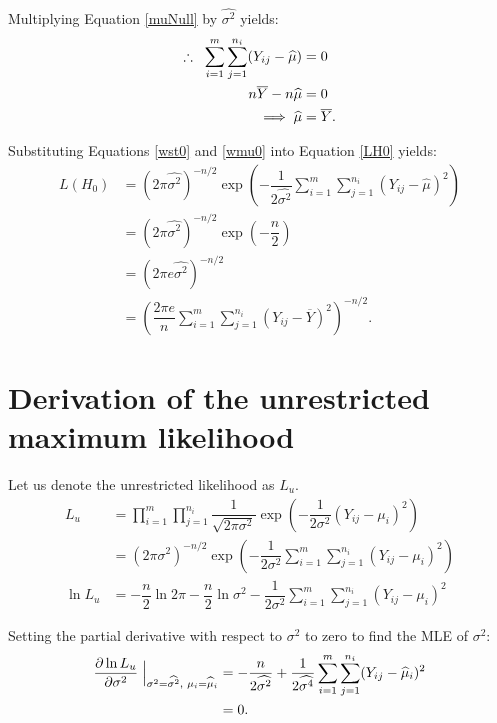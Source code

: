 \documentclass[12pt,a4paper,openright]{article}
\newcommand{\eqn}[1]{Equation \ref{#1}}
\newcommand{\ovY}{\overline{Y}}
\newcommand{\wmu}{\widehat{\mu}}
\newcommand{\wst}{\widehat{\sigma^2}}
\begin{document}
	Multiplying \eqn{muNull} by $\wst$ yields:
	\begin{align}
		\therefore \hspace{0.2cm} \sum_{i=1}^m \sum_{j=1}^{n_i} (Y_{ij}-\wmu) &= 0 \nonumber\\
		n\ovY - n\wmu &= 0 \nonumber \\
		\implies \wmu &= \ovY. \label{wmu0}
	\end{align}

	Substituting Equations \ref{wst0} and \ref{wmu0} into \eqn{LH0} yields:
	\begin{align}
		L(H_0) &= (2\pi\wst)^{-n/2} \exp{\left(-\dfrac{1}{2\wst} \sum_{i=1}^m \sum_{j=1}^{n_i} (Y_{ij}-\wmu)^2\right)} \nonumber\\
		&= (2\pi \wst)^{-n/2} \exp\left(-\dfrac{n}{2}\right) \nonumber \\
		&= (2\pi e\wst)^{-n/2} \nonumber \\
		&= \left(\dfrac{2\pi e}{n} \sum_{i=1}^m \sum_{j=1}^{n_i} (Y_{ij}-\ovY)^2\right)^{-n/2}.\label{MLE0}
	\end{align}

	\section{Derivation of the unrestricted maximum likelihood}
	Let us denote the unrestricted likelihood as $L_u$. 
	\begin{align}
		L_u &= \prod_{i=1}^m \prod_{j=1}^{n_i} \dfrac{1}{\sqrt{2\pi \sigma^2}} \exp{\left(-\dfrac{1}{2\sigma^2} (Y_{ij}-\mu_i)^2\right)} \nonumber\\
		&= (2\pi \sigma^2)^{-n/2} \exp{\left(-\dfrac{1}{2\sigma^2}\sum_{i=1}^m \sum_{j=1}^{n_i} (Y_{ij}-\mu_i)^2\right)} \label{Lu}\\
		\ln{L_u} &= -\dfrac{n}{2}\ln{2\pi} - \dfrac{n}{2} \ln{\sigma^2} - \dfrac{1}{2\sigma^2} \sum_{i=1}^m \sum_{j=1}^{n_i} (Y_{ij}-\mu_i)^2 \nonumber
	\end{align}

	Setting the partial derivative with respect to $\sigma^2$ to zero to find the MLE of $\sigma^2$:
	\begin{align}
		\dfrac{\partial \ln{L_u}}{\partial \sigma^2} \Bigm\lvert_{\sigma^2=\wst, \hspace{0.1cm}\mu_i = \wmu_i} &= -\dfrac{n}{2\wst} + \dfrac{1}{2\widehat{\sigma^4}} \sum_{i=1}^m \sum_{j=1}^{n_i} (Y_{ij}-\wmu_i)^2 \nonumber \\
		&=0. \label{varUnrest}
	\end{align}
\end{document}
